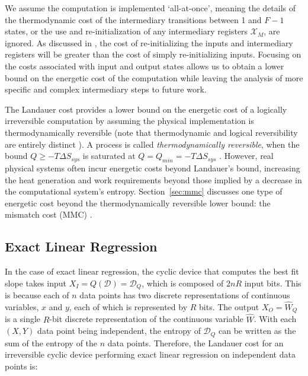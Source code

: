\documentclass[12pt,onecolumn, margin=1in]{IEEEtran}
\newcommand{\Wh}{\hat{W}}
\begin{document}
We assume the computation is implemented `all-at-once', meaning the details of the thermodynamic cost of the intermediary transitions between 1 and $F-1$ states, or the use and re-initialization of any intermediary registers $\mathcal{X}_M$, are ignored. As discussed in \cite[p. 55]{Wolpert2019}, the cost of re-initializing the inputs and intermediary registers will be greater than the cost of simply re-initializing inputs. Focusing on the costs associated with input and output states allows us to obtain a lower bound on the energetic cost of the computation while leaving the analysis of more specific and complex intermediary steps to future work. 



The Landauer cost provides a lower bound on the energetic cost of a logically irreversible computation by assuming the physical implementation is thermodynamically reversible (note that thermodynamic and logical reversibility are entirely distinct \cite{MARONEY_no_relationship}). A process is called \textit{thermodynamically reversible}, when the bound $Q \geq -T \Delta S_{sys}$ is saturated at $Q = Q_{min} = -T \Delta S_{sys}$ \cite{Callen,landau1980statistical, chandler}. However, real physical systems often incur energetic costs beyond Landauer's bound, increasing the heat generation and work requirements beyond those implied by a decrease in the computational system's entropy. Section~\ref{sec:mmc} discusses one type of energetic cost beyond the thermodynamically reversible lower bound: the mismatch cost (MMC) \cite{Wolpert2019, Yadav2025, KolchinskyWolpert2021, Manzano2024}.



\subsection{Exact Linear Regression}

In the case of exact linear regression, the cyclic device that computes the best fit slope takes input $X_I = Q(\mathcal{D}) = \mathcal{D}_Q$, which is composed of $2nR$ input bits. This is because each of $n$ data points has two discrete representations of continuous variables, $x$ and $y$, each of which is represented by $R$ bits. The output $X_O= \hat W_Q$ is a single $R$-bit discrete representation of the continuous variable $\Wh$. With each $(X,Y)$ data point being independent, the entropy of $\mathcal{D}_Q$ can be written as the sum of the entropy of the $n$ data points. Therefore, the Landauer cost for an irreversible cyclic device performing exact linear regression on independent data points is:
\end{document}
